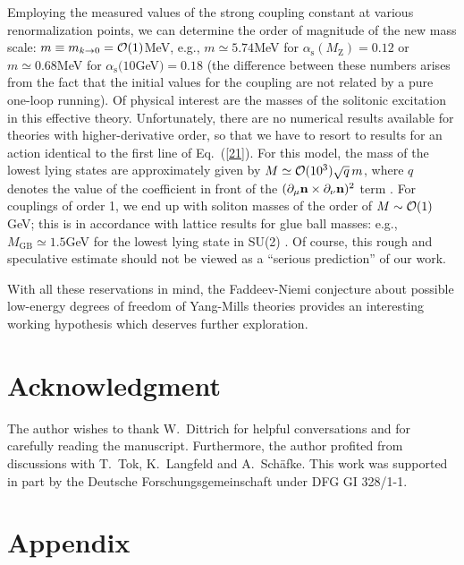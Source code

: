 \documentclass[a4paper,12pt]{article}
\newcommand{\re}[1]{~(\ref{#1})}
\begin{document}
Employing the measured values of the strong coupling constant at
various renormalization points, we can determine the order of
magnitude of the new mass scale: $m\equiv m_{k\to 0}= {\cal O}(1)$MeV,
e.g., $m\simeq5.74$MeV for $\alpha_{\text{s}}(M_{\text{Z}})=0.12$ or
$m\simeq0.68$MeV for $\alpha_{\text{s}}(10$GeV$)=0.18$ (the difference
between these numbers arises from the fact that the initial values for
the coupling are not related by a pure one-loop running). Of physical
interest are the masses of the solitonic excitation in this effective
theory. Unfortunately, there are no numerical results available for
theories with higher-derivative order, so that we have to resort to
results for an action identical to the first line of Eq.\re{21}. For
this model, the mass of the lowest lying states are approximately
given by $M\simeq{\cal O}(10^3) \sqrt{q}\, m$, where $q$ denotes the
value of the coefficient in front of the
$(\partial_\mu\mathbf{n}\times\partial_\nu\mathbf{n})^2$ term
\cite{Gladikowski:1997mb,Battye:1999zn}. For couplings of order 1, we
end up with soliton masses of the order of $M\sim{\cal O}(1)$GeV; this
is in accordance with lattice results for glue ball masses: e.g., 
$M_{\text{GB}}\simeq 1.5$GeV for the lowest lying state in SU(2)
\cite{Teper:1998kw}. Of course, this rough and speculative estimate
should not be viewed as a ``serious prediction'' of our work.

With all these reservations in mind, the Faddeev-Niemi conjecture
about possible low-energy degrees of freedom of Yang-Mills theories
provides an interesting working hypothesis which deserves further
exploration. 

\section*{Acknowledgment}

The author wishes to thank W.~Dittrich for helpful conversations and
for carefully reading the manuscript. Furthermore, the author
profited from discussions with T.~Tok, K.~Langfeld and
A.~Sch\"afke. This work was supported in part by the Deutsche
Forschungsgemeinschaft under DFG GI 328/1-1.  


\section*{Appendix}

\renewcommand{\thesection}{\mbox{\Alph{section}}}
\renewcommand{\theequation}{\mbox{\Alph{section}.\arabic{equation}}}
\setcounter{section}{0}
\setcounter{equation}{0}
\end{document}

